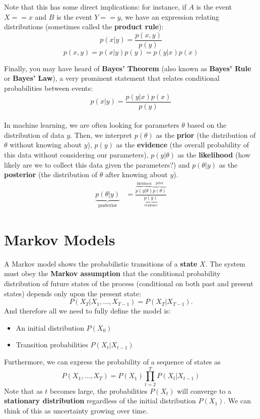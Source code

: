 \documentclass[11pt]{article}
\begin{document}
\noindent Note that this has some direct implications: for instance, if $A$ is the event $X == x$ and $B$ is the event $Y == y$, we have an expression relating distributions (sometimes called the {\bf{product rule}}):
$$ p(x | y) = \frac{p(x, y)}{p(y)}$$
$$ p(x, y) = p(x | y) p(y) = p(y | x) p(x)$$

\noindent Finally, you may have heard of {\bf{Bayes' Theorem}} (also known as {\bf{Bayes' Rule}} or {\bf{Bayes' Law}}), a very prominent statement that relates conditional probabilities between events:
$$ p(x | y) = \frac{p(y | x) p(x)}{p(y)} $$ \\
In machine learning, we are often looking for parameters $\theta$ based on the distribution of data $y$. Then, we interpret $p(\theta)$ as the {\bf{prior}} (the distribution of $\theta$ without knowing about $y$), $p(y)$ as the {\bf{evidence}} (the overall probability of this data without considering our parameters), $p( y | \theta)$ as the {\bf{likelihood}} (how likely are we to collect this data given the parameters?) and $p( \theta | y)$ as the {\bf{posterior}} (the distribution of $\theta$ after knowing about $y$).
\begin{align*}
\underbrace{p(\theta | y)}_{\text{posterior}}
&= \frac{\overbrace{ p(y | \theta) }^{\text{likelihood}} 
	\overbrace{ p(\theta) }^{\text{prior}}}
{\underbrace{p(y)}_{\text{evidence}}}
\end{align*}
\section{Markov Models}
\noindent A Markov model shows the probabilistic transitions of a \textbf{state} $X$. The system must obey the {\bf{Markov assumption}} that the conditional probability distribution of future states of the process (conditional on both past and present states) depends only upon the present state:
\[
P(X_T|X_1, \ldots, X_{T-1}) = P(X_T|X_{T-1}).
\]
And therefore all we need to fully define the model is:
\begin{itemize}
    \item An initial distribution $P(X_0)$
    \item Transition probabilities $P(X_{t}|X_{t-1})$
\end{itemize}
Furthermore, we can express the probability of a sequence of states as
\[
P(X_1, \ldots, X_T) = P(X_1) \prod_{t=2}^T P(X_t|X_{t-1})
\]
Note that as $t$ becomes large, the probabilities $P(X_t)$ will converge to a \textbf{stationary distribution} regardless of the initial distribution $P(X_1)$. We can think of this as uncertainty growing over time. \\ 
\end{document}
